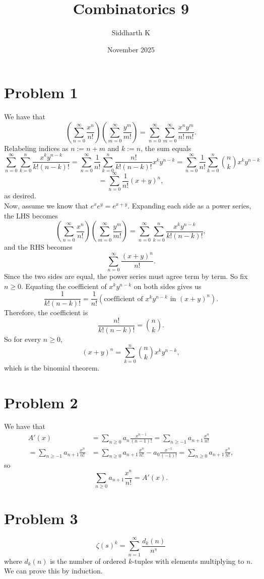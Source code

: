 \documentclass{article}
\title{Combinatorics 9}
\author{Siddharth K}
\date{November 2025}
\newcommand{\bigp}[1]{\left(#1\right)}
\begin{document}
\maketitle

\section*{Problem 1}
We have that
$$\bigp{\sum_{n = 0}^\infty \frac{x^n}{n!}}\bigp{\sum_{m = 0}^\infty \frac{y^m}{m!}} = \sum_{n = 0}^\infty \sum_{m = 0}^\infty \frac{x^n y^m}{n!\,m!}.$$
Relabeling indices as $n := n + m$ and $k := n$, the sum equals
$$\sum_{n = 0}^\infty \sum_{k = 0}^n \frac{x^ky^{n - k}}{k!(n - k)!} = \sum_{n = 0}^\infty \frac{1}{n!}\sum_{k = 0}^n \frac{n!}{k!(n - k)!}x^k y^{n - k} = \sum_{n = 0}^\infty \frac{1}{n!}\sum_{k = 0}^n \binom{n}{k}x^ky^{n - k}$$
$$= \sum_{n = 0}^\infty\frac{1}{n!}(x + y)^n,$$
as desired. \\

Now, assume we know that $e^xe^y = e^{x + y}$. Expanding each side as a power series, the LHS becomes
$$\bigp{\sum_{n = 0}^\infty \frac{x^n}{n!}}\bigp{\sum_{m = 0}^\infty \frac{y^m}{m!}} = \sum_{n = 0}^\infty \sum_{k = 0}^n \frac{x^ky^{n - k}}{k!(n - k)!},$$
and the RHS becomes
$$\sum_{n = 0}^\infty\frac{(x + y)^n}{n!}.$$
Since the two sides are equal, the power series must agree term by term. So fix $n \ge 0$. Equating the coefficient of $x^k y^{n - k}$ on both sides gives us
$$\frac{1}{k!(n - k)!} = \frac{1}{n!}(\text{coefficient of } x^ky^{n - k} \text{ in } (x + y)^n).$$
Therefore, the coefficient is
$$\frac{n!}{k!(n - k)!} = \binom nk.$$
So for every $n \ge 0$,
$$(x + y)^n = \sum_{k = 0}^n \binom nk x^ky^{n - k},$$
which is the binomial theorem.

\section*{Problem 2}
We have that
\begin{align*}
A'(x) &= \sum_{n \ge 0} a_n\frac{x^{n - 1}}{(n-1)!} = \sum_{n \ge -1}a_{n + 1}\frac{x^n}{n!} \\
= \sum_{n \ge -1}a_{n + 1}\frac{x^n}{n!} &= \sum_{n \ge 0}a_{n + 1}\frac{x^n}{n!} - a_0\frac{x^{-1}}{(-1)!} = \sum_{n \ge 0}a_{n + 1}\frac{x^n}{n!},
\end{align*}
so
$$\sum_{n \ge 0}a_{n + 1}\frac{x^n}{n!} = A'(x).$$

\section*{Problem 3}
$$\zeta(s)^k = \sum_{n = 1}^\infty \frac{d_k(n)}{n^s}$$
where $d_k(n)$ is the number of ordered $k$-tuples with elements multiplying to $n$. We can prove this by induction. \\
\end{document}
